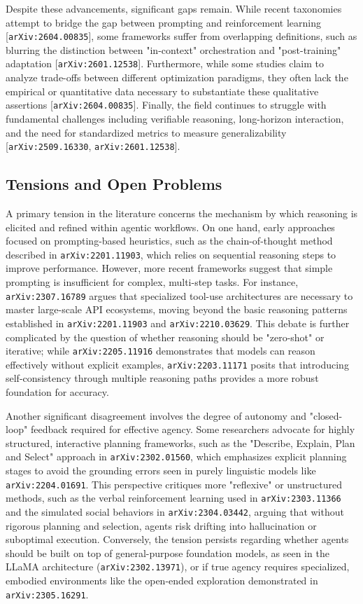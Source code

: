 \documentclass[11pt]{article}
\begin{document}
Despite these advancements, significant gaps remain. While recent taxonomies attempt to bridge the gap between prompting and reinforcement learning [\texttt{arXiv:2604.00835}], some frameworks suffer from overlapping definitions, such as blurring the distinction between "in-context" orchestration and "post-training" adaptation [\texttt{arXiv:2601.12538}]. Furthermore, while some studies claim to analyze trade-offs between different optimization paradigms, they often lack the empirical or quantitative data necessary to substantiate these qualitative assertions [\texttt{arXiv:2604.00835}]. Finally, the field continues to struggle with fundamental challenges including verifiable reasoning, long-horizon interaction, and the need for standardized metrics to measure generalizability [\texttt{arXiv:2509.16330}, \texttt{arXiv:2601.12538}].

\subsection{Tensions and Open Problems}

A primary tension in the literature concerns the mechanism by which reasoning is elicited and refined within agentic workflows. On one hand, early approaches focused on prompting-based heuristics, such as the chain-of-thought method described in \texttt{arXiv:2201.11903}, which relies on sequential reasoning steps to improve performance. However, more recent frameworks suggest that simple prompting is insufficient for complex, multi-step tasks. For instance, \texttt{arXiv:2307.16789} argues that specialized tool-use architectures are necessary to master large-scale API ecosystems, moving beyond the basic reasoning patterns established in \texttt{arXiv:2201.11903} and \texttt{arXiv:2210.03629}. This debate is further complicated by the question of whether reasoning should be "zero-shot" or iterative; while \texttt{arXiv:2205.11916} demonstrates that models can reason effectively without explicit examples, \texttt{arXiv:2203.11171} posits that introducing self-consistency through multiple reasoning paths provides a more robust foundation for accuracy.

Another significant disagreement involves the degree of autonomy and "closed-loop" feedback required for effective agency. Some researchers advocate for highly structured, interactive planning frameworks, such as the "Describe, Explain, Plan and Select" approach in \texttt{arXiv:2302.01560}, which emphasizes explicit planning stages to avoid the grounding errors seen in purely linguistic models like \texttt{arXiv:2204.01691}. This perspective critiques more "reflexive" or unstructured methods, such as the verbal reinforcement learning used in \texttt{arXiv:2303.11366} and the simulated social behaviors in \texttt{arXiv:2304.03442}, arguing that without rigorous planning and selection, agents risk drifting into hallucination or suboptimal execution. Conversely, the tension persists regarding whether agents should be built on top of general-purpose foundation models, as seen in the LLaMA architecture (\texttt{arXiv:2302.13971}), or if true agency requires specialized, embodied environments like the open-ended exploration demonstrated in \texttt{arXiv:2305.16291}.
\end{document}
